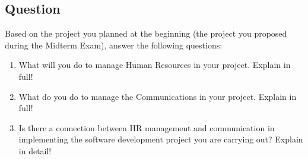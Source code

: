 \documentclass[12pt,titlepage]{article}
\begin{document}
\subsection*{Question}
\noindent
Based on the project you planned at the beginning (the project you proposed during the Midterm Exam), answer the following questions:
\begin{enumerate}
    \item What will you do to manage Human Resources in your project. Explain in full!
    \item What do you do to manage the Communications in your project. Explain in full!
    \item Is there a connection between HR management and communication in implementing the software development project you are carrying out? Explain in detail!
\end{enumerate}
\end{document}
